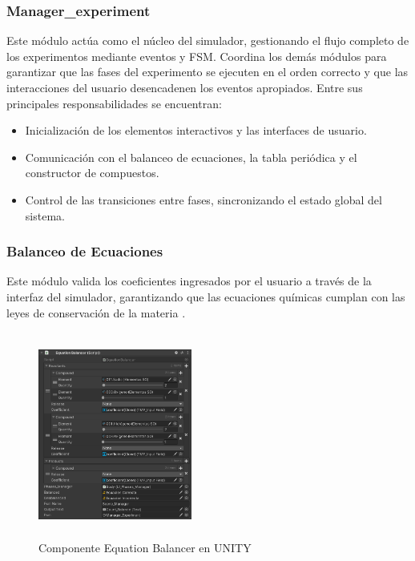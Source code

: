 \documentclass[conference]{IEEEtran}
\begin{document}
\subsubsection{Manager\_experiment}

Este módulo actúa como el núcleo del simulador, gestionando el flujo completo de los experimentos mediante eventos y FSM. Coordina los demás módulos para garantizar que las fases del experimento se ejecuten en el orden correcto y que las interacciones del usuario desencadenen los eventos apropiados. Entre sus principales responsabilidades se encuentran:
\begin{itemize}
    \item Inicialización de los elementos interactivos y las interfaces de usuario.
    \item Comunicación con el balanceo de ecuaciones, la tabla periódica y el constructor de compuestos.
    \item Control de las transiciones entre fases, sincronizando el estado global del sistema.
\end{itemize}

\subsubsection{Balanceo de Ecuaciones}

Este módulo valida los coeficientes ingresados por el usuario a través de la interfaz del simulador, garantizando que las ecuaciones químicas cumplan con las leyes de conservación de la materia \cite{Estequiometria}.
\begin{figure}[thbp]
    \centering
    \includegraphics[width=0.45\textwidth, height = 6.75cm]{img/Equation_Balancer.png}
    \caption{Componente Equation Balancer en UNITY}
    \label{fig:Componente Equation Balancer en UNITY}
\end{figure}
\end{document}

